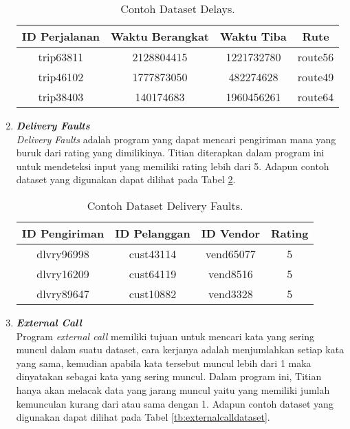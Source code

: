 \begin{enumerate}
            \begin{longtable}{|c|c|c|c|}
                  \caption{Contoh Dataset Delays.}
                  \label{tb:delaysdataset} \\
                  \hline
                  \rowcolor[HTML]{C0C0C0}
                  \textbf{ID Perjalanan} & \textbf{Waktu Berangkat} & \textbf{Waktu Tiba} & \textbf{Rute} \\
                  \hline
                  trip63811 & 2128804415 & 1221732780 & route56 \\
                  trip46102 & 1777873050 & 482274628 & route49 \\
                  trip38403 & 140174683 & 1960456261 & route64 \\
                  \hline
            \end{longtable}

      \item \emph{\textbf{Delivery Faults}} \\
            \emph{Delivery Faults} adalah program yang dapat mencari pengiriman mana yang buruk dari rating yang dimilikinya. Titian diterapkan dalam program ini untuk mendeteksi input yang memiliki rating lebih dari 5.
            Adapun contoh dataset yang digunakan dapat 
            dilihat pada Tabel \ref{tb:deliveryfaultsdataset}.

            \begin{longtable}{|c|c|c|c|}
                  \caption{Contoh Dataset Delivery Faults.}
                  \label{tb:deliveryfaultsdataset} \\
                  \hline
                  \rowcolor[HTML]{C0C0C0}
                  \textbf{ID Pengiriman} & \textbf{ID Pelanggan} & \textbf{ID Vendor} & \textbf{Rating} \\
                  \hline
                  dlvry96998 & cust43114 & vend65077 & 5 \\
                  dlvry16209 & cust64119 & vend8516 & 5 \\
                  dlvry89647 & cust10882 & vend3328 & 5 \\
                  \hline
            \end{longtable}

      \item \emph{\textbf{External Call}} \\
            Program \emph{external call} memiliki tujuan untuk mencari kata yang sering muncul dalam suatu dataset, cara kerjanya adalah menjumlahkan setiap kata yang sama, kemudian apabila kata tersebut muncul lebih dari 1 maka dinyatakan sebagai kata yang sering muncul. Dalam program ini, Titian hanya akan melacak data yang jarang muncul yaitu yang memiliki jumlah kemunculan kurang dari atau sama dengan 1.
            Adapun contoh dataset yang digunakan dapat 
            dilihat pada Tabel \ref{tb:externalcalldataset}.


\end{enumerate}
